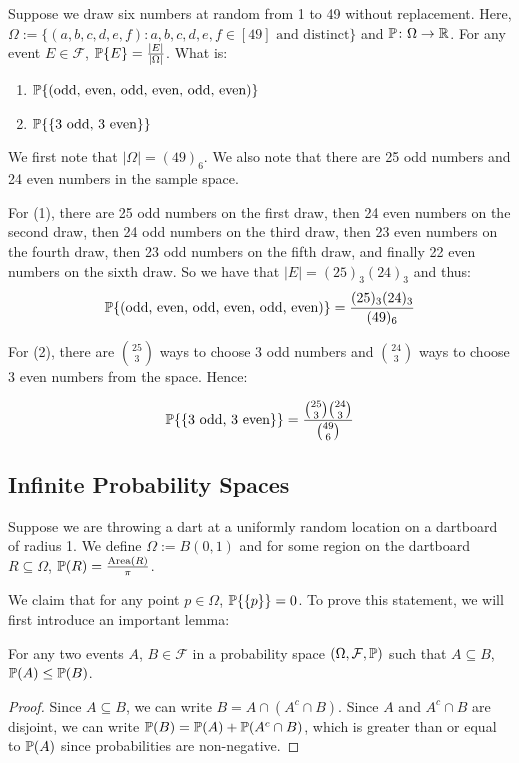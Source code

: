 \begin{example}[Lotto 6/49]
   Suppose we draw six numbers at random from 1 to 49 without replacement. Here, $\Omega := \{(a,b,c,d,e,f) \colon a,b,c,d,e,f \in [49] \text{ and distinct}\}$ and $\mathbb{P} \colon \Omega \to \mathbb{R}$. For any event $E \in \mathcal{F}$, $\mathbb{P}\{E\} = \frac{|E|}{|\Omega|}$. What is:
   \begin{enumerate}
      \item $\mathbb{P}\{(\text{odd, even, odd, even, odd, even})\}$
      \item $\mathbb{P}\{\{\text{3 odd, 3 even}\}\}$
   \end{enumerate}
\end{example}
\begin{solution}
   We first note that $|\Omega| = (49)_6$. We also note that there are 25 odd numbers and 24 even numbers in the sample space.

   For (1), there are 25 odd numbers on the first draw, then 24 even numbers on the second draw, then 24 odd numbers on the third draw, then 23 even numbers on the fourth draw, then 23 odd numbers on the fifth draw, and finally 22 even numbers on the sixth draw. So we have that $|E| = (25)_3(24)_3$ and thus:
   \[ \mathbb{P}\{(\text{odd, even, odd, even, odd, even})\} = \frac{(25)_3(24)_3}{(49)_6}\]

   For (2), there are $\binom{25}{3}$ ways to choose 3 odd numbers and $\binom{24}{3}$ ways to choose 3 even numbers from the space. Hence:

   \[ \mathbb{P}\{\{\text{3 odd, 3 even}\}\} = \frac{\binom{25}{3}\binom{24}{3}}{\binom{49}{6}} \qedhere \]
\end{solution}

\subsection{Infinite Probability Spaces}

Suppose we are throwing a dart at a uniformly random location on a dartboard of radius 1. We define $\Omega := B(0,1)$ and for some region on the dartboard $R\subseteq \Omega$, $\mathbb{P}(R) = \frac{\text{Area}(R)}{\pi}$.

We claim that for any point $p \in \Omega$, $\mathbb{P}\{\{p\}\} = 0$. To prove this statement, we will first introduce an important lemma:

\begin{lemmabox}
   For any two events $A$, $B \in \mathcal{F}$ in a probability space $(\Omega, \mathcal{F}, \mathbb{P})$ such that $A \subseteq B$, $\mathbb{P}(A) \leq \mathbb{P}(B)$.
\end{lemmabox}
\begin{proof}
   Since $A \subseteq B$, we can write $B = A \cap (A^c \cap B)$. Since $A$ and $A^c \cap B$ are disjoint, we can write $\mathbb{P}(B) = \mathbb{P}(A) + \mathbb{P}(A^c \cap B)$, which is greater than or equal to $\mathbb{P}(A)$ since probabilities are non-negative.
\end{proof}

